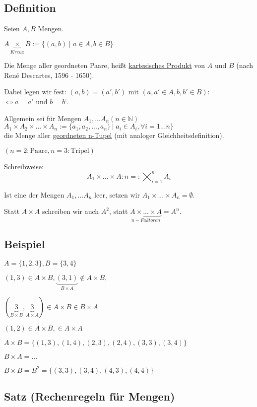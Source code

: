 \documentclass[a4paper, 12pt, twoside] {article}
\begin{document}
\subsection{Definition}
Seien $A, B$ Mengen.

$A \underbrace{\times}_{Kreuz} B := \{(a, b) \mid a \in A, b \in B\}$

Die Menge aller geordneten Paare, heißt \underline{kartesisches Produkt} von $A$ und $B$ (nach René Descartes, 1596 - 1650).

Dabei legen wir fest: $(a, b) = (a', b')$ mit $(a, a' \in A, b, b' \in B):$ \\
$\Leftrightarrow a = a' \text{ und } b = b‘$.

Allgemein sei für Mengen $A_1, ... A_n (n \in \mathbb{N})$ \\
$A_1 \times A_2 \times ... \times A_n := \{a_1, a_2, ..., a_n) \mid a_i \in A_i, \forall i = 1 ... n\}$ \\
die Menge aller \underline{geordneten n-Tupel} (mit analoger Gleichheitsdefinition).

$(n = 2: \text{Paare}, n = 3: \text{Tripel})$

Schreibweise: \\
$$A_1 \times ... \times A:n =: \bigtimes_{i=1}^{n} A_i$$

Ist eine der Mengen $A_1, ... A_n$ leer, setzen wir $A_1 \times ... \times A_n = \emptyset$.

Statt $A \times A$ schreiben wir auch $A^2$, statt $\underbrace{A \times ... \times A}_{n-Faktoren} = A^n$.


\subsection{Beispiel}
$A = \{1, 2, 3\}, B = \{3, 4\}$

$(1, 3) \in A \times B, \underbrace{(3, 1)}_{B \times A} \notin A \times B,$

$(\underbrace{3}_{B \times B}, \underbrace{3}_{A \times A}) \in A \times B\in B \times A$

$(1, 2) \in A \times B, \in A \times A$

$A \times B = \{(1, 3), (1, 4), (2, 3), (2, 4), (3, 3), (3, 4)\}$

$B \times A = ...$

$B \times B = B^2 = \{(3, 3), (3, 4), (4, 3), (4, 4)\}$


\subsection{Satz (Rechenregeln für Mengen)}
\end{document}
